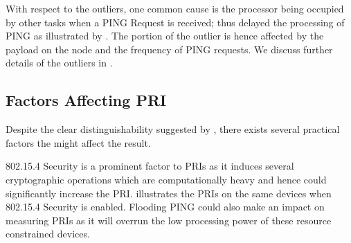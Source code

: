 With respect to the outliers, one common cause is the processor being occupied by other tasks when a PING Request is received; thus delayed the processing of PING as illustrated by . The portion of the outlier is hence affected by the payload on the node and the frequency of PING requests. We discuss further details of the outliers in .

\subsection{Factors Affecting PRI} \label{PingDevice}

Despite the clear distinguishability suggested by , there exists several practical factors the might affect the result.

802.15.4 Security\cite{802154} is a prominent factor to PRIs as it induces several cryptographic operations which are computationally heavy and hence could significantly increase the PRI.  illustrates the PRIs on the same devices when 802.15.4 Security is enabled. Flooding PING could also make an impact on measuring PRIs as it will overrun the low processing power of these resource constrained devices.

